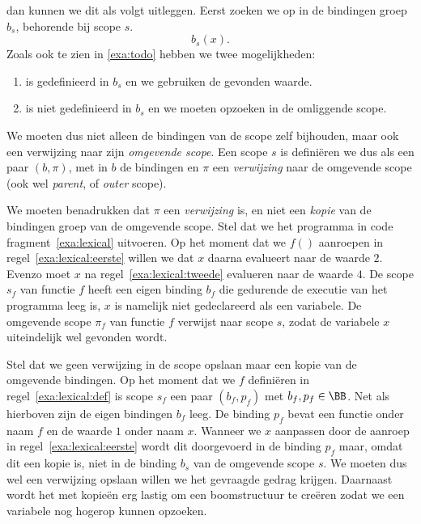 \newCodeFragment
{}

dan kunnen we dit als volgt uitleggen. Eerst zoeken we  op in de bindingen groep $b_s$, behorende bij scope $s$.
\begin{equation*}
  b_s(x).
\end{equation*}
Zoals ook te zien in \ref{exa:todo} hebben we twee mogelijkheden:


\begin{enumerate}
  \item {} is gedefinieerd in $b_s$ en we gebruiken de gevonden waarde.
  \item {} is niet gedefinieerd in $b_s$ en we moeten  opzoeken in de omliggende scope.
\end{enumerate}

We moeten dus niet alleen de bindingen van de scope zelf bijhouden, maar ook een verwijzing naar zijn \emph{omgevende scope}. Een scope $s$ is definiëren we dus als een paar $(b,\pi)$, met in $b$ de bindingen en $\pi$ een \emph{verwijzing} naar de omgevende scope (ook wel \emph{parent}, of \emph{outer} scope).

We moeten benadrukken dat $\pi$ een \emph{verwijzing} is, en niet een \emph{kopie} van de bindingen groep van de omgevende scope. Stel dat we het programma in code fragment~\ref{exa:lexical} uitvoeren. Op het moment dat we $f()$ aanroepen in regel~\ref{exa:lexical:eerste} willen we dat $x$ daarna evalueert naar de waarde $2$. Evenzo moet $x$ na regel~\ref{exa:lexical:tweede} evalueren naar de waarde $4$. De scope $s_f$ van functie $f$ heeft een eigen binding $b_f$ die gedurende de executie van het programma leeg is, $x$ is namelijk niet gedeclareerd als een \LOCAL variabele. De omgevende scope $\pi_f$ van functie $f$ verwijst naar scope $s$, zodat de variabele $x$ uiteindelijk wel gevonden wordt.

\codeFragmentCaption
{}

Stel dat we geen verwijzing in de scope opslaan maar een kopie van de omgevende bindingen. Op het moment dat we $f$ definiëren in regel~\ref{exa:lexical:def} is scope $s_f$ een paar $(b_f,p_f)$ met $b_f,p_f\in\BB$. Net als hierboven zijn de eigen bindingen $b_f$ leeg. De binding $p_f$ bevat een functie onder naam $f$ en de waarde $1$ onder naam $x$. Wanneer we $x$ aanpassen door de aanroep in regel~\ref{exa:lexical:eerste} wordt dit doorgevoerd in de binding $p_f$ maar, omdat dit een kopie is, niet in de binding $b_s$ van de omgevende scope $s$. We moeten dus wel een verwijzing opslaan willen we het gevraagde gedrag krijgen. Daarnaast wordt het met kopieën erg lastig om een boomstructuur te creëren zodat we een variabele nog hogerop kunnen opzoeken.

